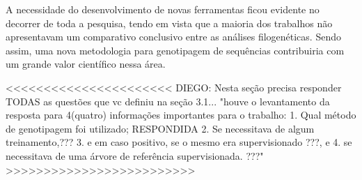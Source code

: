\documentclass[12pt]{article}
\begin{document}
A necessidade do desenvolvimento de novas ferramentas ficou evidente no decorrer de toda a pesquisa, tendo em vista que a maioria dos trabalhos não apresentavam um comparativo conclusivo entre as análises filogenéticas. Sendo assim, uma nova metodologia para genotipagem de sequências contribuiria com um grande valor científico nessa área.

<<<<<<<<<<<<<<<<<<<<<<
DIEGO: Nesta seção precisa responder TODAS as questões que vc definiu na seção 3.1...
"houve o levantamento da resposta para 4(quatro) informações importantes para o trabalho: 
1. Qual método de genotipagem foi utilizado; RESPONDIDA 
2. Se necessitava de algum treinamento,???
3. e em caso positivo, se o mesmo era supervisionado ???, e 
4. se necessitava de uma árvore de referência supervisionada. ???"
>>>>>>>>>>>>>>>>>>>>>>>>>



\end{document}
